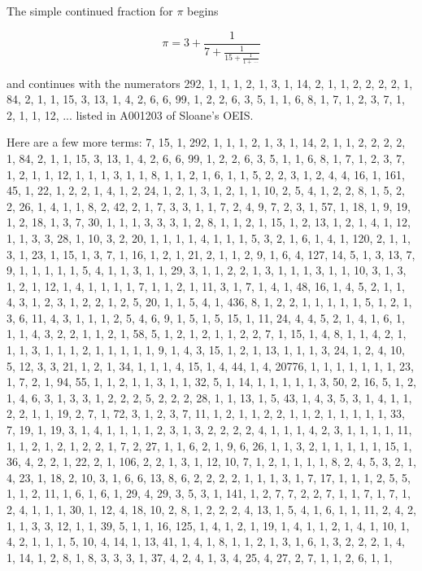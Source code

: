 \documentclass[12pt]{article}
\begin{document}
The simple continued fraction for $\pi$ begins

$$\pi = 3 + \frac{1}{{7} + \frac{1}{{15} + \frac{1}{{1} + \, \cdots}}}$$

and continues with the numerators 292, 1, 1, 1, 2, 1, 3, 1, 14, 2, 1, 1, 2, 2, 2, 2, 1, 84, 2, 1, 1, 15, 3, 13, 1, 4, 2, 6, 6, 99, 1, 2, 2, 6, 3, 5, 1, 1, 6, 8, 1, 7, 1, 2, 3, 7, 1, 2, 1, 1, 12, ... listed in A001203 of Sloane's OEIS.

Here are a few more terms: 7, 15, 1, 292, 1, 1, 1, 2, 1, 3, 1, 14, 2, 1, 1, 2, 2, 2, 2, 1, 84, 2, 1, 1, 15, 3, 13, 1, 4, 2, 6, 6, 99, 1, 2, 2, 6, 3, 5, 1, 1, 6, 8, 1, 7, 1, 2, 3, 7, 1, 2, 1, 1, 12, 1, 1, 1, 3, 1, 1, 8, 1, 1, 2, 1, 6, 1, 1, 5, 2, 2, 3, 1, 2, 4, 4, 16, 1, 161, 45, 1, 22, 1, 2, 2, 1, 4, 1, 2, 24, 1, 2, 1, 3, 1, 2, 1, 1, 10, 2, 5, 4, 1, 2, 2, 8, 1, 5, 2, 2, 26, 1, 4, 1, 1, 8, 2, 42, 2, 1, 7, 3, 3, 1, 1, 7, 2, 4, 9, 7, 2, 3, 1, 57, 1, 18, 1, 9, 19, 1, 2, 18, 1, 3, 7, 30, 1, 1, 1, 3, 3, 3, 1, 2, 8, 1, 1, 2, 1, 15, 1, 2, 13, 1, 2, 1, 4, 1, 12, 1, 1, 3, 3, 28, 1, 10, 3, 2, 20, 1, 1, 1, 1, 4, 1, 1, 1, 5, 3, 2, 1, 6, 1, 4, 1, 120, 2, 1, 1, 3, 1, 23, 1, 15, 1, 3, 7, 1, 16, 1, 2, 1, 21, 2, 1, 1, 2, 9, 1, 6, 4, 127, 14, 5, 1, 3, 13, 7, 9, 1, 1, 1, 1, 1, 5, 4, 1, 1, 3, 1, 1, 29, 3, 1, 1, 2, 2, 1, 3, 1, 1, 1, 3, 1, 1, 10, 3, 1, 3, 1, 2, 1, 12, 1, 4, 1, 1, 1, 1, 7, 1, 1, 2, 1, 11, 3, 1, 7, 1, 4, 1, 48, 16, 1, 4, 5, 2, 1, 1, 4, 3, 1, 2, 3, 1, 2, 2, 1, 2, 5, 20, 1, 1, 5, 4, 1, 436, 8, 1, 2, 2, 1, 1, 1, 1, 1, 5, 1, 2, 1, 3, 6, 11, 4, 3, 1, 1, 1, 2, 5, 4, 6, 9, 1, 5, 1, 5, 15, 1, 11, 24, 4, 4, 5, 2, 1, 4, 1, 6, 1, 1, 1, 4, 3, 2, 2, 1, 1, 2, 1, 58, 5, 1, 2, 1, 2, 1, 1, 2, 2, 7, 1, 15, 1, 4, 8, 1, 1, 4, 2, 1, 1, 1, 3, 1, 1, 1, 2, 1, 1, 1, 1, 1, 9, 1, 4, 3, 15, 1, 2, 
1, 13, 1, 1, 1, 3, 24, 1, 2, 4, 10, 5, 12, 3, 3, 21, 1, 2, 1, 34, 1, 1, 1, 4, 15, 1, 4, 44, 1, 4, 20776, 1, 1, 1, 1, 1, 1, 1, 23, 1, 7, 2, 1, 94, 55, 1, 1, 2, 1, 1, 3, 1, 1, 32, 5, 1, 14, 1, 1, 1, 1, 1, 3, 50, 2, 16, 5, 1, 2, 1, 4, 6, 3, 1, 3, 3, 1, 2, 2, 2, 5, 2, 2, 2, 28, 1, 1, 13, 1, 5, 43, 1, 4, 3, 5, 3, 1, 4, 1, 1, 2, 2, 1, 1, 19, 2, 7, 1, 72, 3, 1, 2, 3, 7, 11, 1, 2, 1, 1, 2, 2, 1, 1, 2, 1, 1, 1, 1, 1, 33, 7, 19, 1, 19, 3, 1, 4, 1, 1, 1, 1, 2, 3, 1, 3, 2, 2, 2, 2, 4, 1, 1, 1, 4, 2, 3, 1, 1, 1, 1, 11, 1, 1, 2, 1, 2, 1, 2, 2, 1, 7, 2, 27, 1, 1, 6, 2, 1, 9, 6, 26, 1, 1, 3, 2, 1, 1, 1, 1, 1, 15, 1, 36, 4, 2, 2, 1, 22, 2, 1, 
106, 2, 2, 1, 3, 1, 12, 10, 7, 1, 2, 1, 1, 1, 1, 8, 2, 4, 5, 3, 2, 1, 4, 23, 1, 18, 2, 10, 3, 1, 6, 6, 13, 8, 6, 2, 2, 2, 2, 1, 1, 1, 3, 1, 7, 17, 1, 1, 1, 2, 5, 5, 1, 1, 2, 11, 1, 6, 1, 6, 1, 29, 4, 29, 3, 5, 3, 1, 141, 1, 2, 7, 7, 2, 2, 7, 1, 1, 7, 1, 7, 1, 2, 4, 1, 1, 1, 30, 1, 12, 4, 18, 10, 2, 8, 1, 2, 2, 2, 4, 13, 1, 5, 4, 1, 6, 1, 1, 11, 2, 4, 2, 1, 1, 3, 3, 12, 1, 1, 39, 5, 1, 1, 16, 125, 1, 4, 1, 2, 1, 19, 1, 4, 1, 1, 2, 1, 4, 1, 10, 1, 4, 2, 1, 1, 1, 5, 10, 4, 14, 1, 13, 41, 1, 4, 1, 8, 1, 1, 2, 1, 3, 1, 6, 1, 3, 2, 2, 2, 1, 4, 1, 14, 1, 2, 8, 1, 8, 3, 3, 3, 1, 37, 4, 2, 4, 1, 3, 4, 25, 4, 27, 2, 7, 1, 1, 2, 6, 1, 1, 
\end{document}
